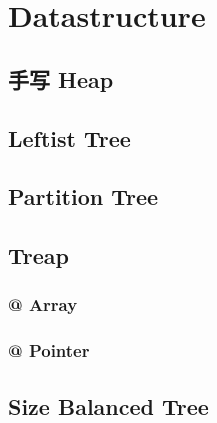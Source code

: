 \section{Datastructure}
	\subsection{手写 Heap}
		
	\subsection{Leftist Tree}
		
	\subsection{Partition Tree}
		
	\subsection{Treap}
		\subsubsection{@ Array}
			
		\subsubsection{@ Pointer}
			
	\subsection{Size Balanced Tree}
		
